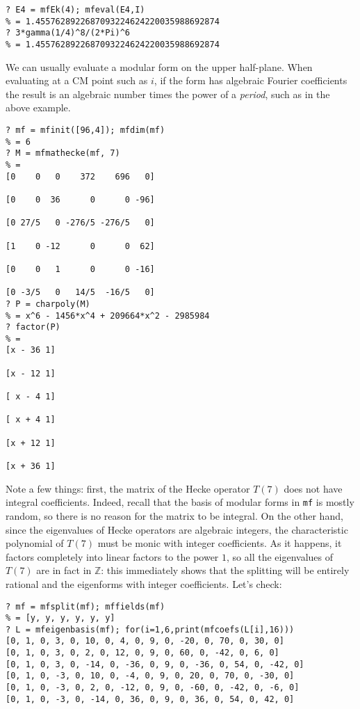 \documentclass[11pt]{article}
\newcommand{\Z}{{\mathbb Z}}
\def\kbd#1{{\tt #1}}
\begin{document}
\medskip

\begin{verbatim}
? E4 = mfEk(4); mfeval(E4,I)
% = 1.4557628922687093224624220035988692874
? 3*gamma(1/4)^8/(2*Pi)^6
% = 1.4557628922687093224624220035988692874
\end{verbatim}

We can usually evaluate a modular form on the upper half-plane. When
evaluating at a CM point such as $i$, if the form has algebraic
Fourier coefficients the result is an algebraic number times the power
of a \emph{period}, such as in the above example.

\medskip

\begin{verbatim}
? mf = mfinit([96,4]); mfdim(mf)
% = 6
? M = mfmathecke(mf, 7)
% =
[0    0   0    372    696   0]

[0    0  36      0      0 -96]

[0 27/5   0 -276/5 -276/5   0]

[1    0 -12      0      0  62]

[0    0   1      0      0 -16]

[0 -3/5   0   14/5  -16/5   0]
? P = charpoly(M)
% = x^6 - 1456*x^4 + 209664*x^2 - 2985984
? factor(P)
% =
[x - 36 1]

[x - 12 1]

[ x - 4 1]

[ x + 4 1]

[x + 12 1]

[x + 36 1]
\end{verbatim}

Note a few things: first, the matrix of the Hecke operator $T(7)$ does not
have integral coefficients. Indeed, recall that the basis of modular forms
in \kbd{mf} is mostly random, so there is no reason for the matrix to be
integral. On the other hand, since the eigenvalues of Hecke operators are
algebraic integers, the characteristic polynomial of $T(7)$ must be monic
with integer coefficients. As it happens, it factors completely into
linear factors to the power $1$, so all the eigenvalues of $T(7)$ are in
fact in $\Z$: this immediately shows that the splitting will be entirely
rational and the eigenforms with integer coefficients. Let's check:

\begin{verbatim}
? mf = mfsplit(mf); mffields(mf)
% = [y, y, y, y, y, y]
? L = mfeigenbasis(mf); for(i=1,6,print(mfcoefs(L[i],16)))
[0, 1, 0, 3, 0, 10, 0, 4, 0, 9, 0, -20, 0, 70, 0, 30, 0]
[0, 1, 0, 3, 0, 2, 0, 12, 0, 9, 0, 60, 0, -42, 0, 6, 0]
[0, 1, 0, 3, 0, -14, 0, -36, 0, 9, 0, -36, 0, 54, 0, -42, 0]
[0, 1, 0, -3, 0, 10, 0, -4, 0, 9, 0, 20, 0, 70, 0, -30, 0]
[0, 1, 0, -3, 0, 2, 0, -12, 0, 9, 0, -60, 0, -42, 0, -6, 0]
[0, 1, 0, -3, 0, -14, 0, 36, 0, 9, 0, 36, 0, 54, 0, 42, 0]
\end{verbatim}
\end{document}
